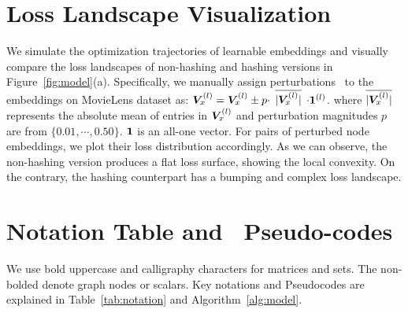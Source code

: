 \appendix

\section{Loss Landscape Visualization}
\label{sec:visualization}
We simulate the optimization trajectories of learnable embeddings and visually compare the loss landscapes of non-hashing and hashing versions in Figure~\ref{fig:model}(a).
Specifically, we manually assign perturbations~\cite{nahshan2021loss, bai2020binarybert} to the embeddings on MovieLens dataset as: {\footnotesize$\boldsymbol{V}_x^{(l)} = \boldsymbol{V}_x^{(l)} \pm p \cdot$ $\overline{|{\boldsymbol{V}_x^{(l)}|}}$ $\cdot \boldsymbol{1}^{(l)}$}.
where {\footnotesize$\overline{|{\boldsymbol{V}_x^{(l)}|}}$} represents the absolute mean of entries in {\footnotesize$\boldsymbol{V}_x^{(l)}$} and perturbation magnitudes $p$ are from $\{0.01, \cdots, 0.50\}$. $\boldsymbol{1}$ is an all-one vector. 
For pairs of perturbed node embeddings, we plot their loss distribution accordingly.
As we can observe, the non-hashing version produces a flat loss surface, showing the local convexity.
On the contrary, the hashing counterpart has a bumping and complex loss landscape.




\section{Notation Table and \model~Pseudo-codes}
\label{app:notation_and_code}
We use bold uppercase and calligraphy characters for matrices and sets. The non-bolded denote graph nodes or scalars. 
Key notations and Pseudocodes are explained in Table~\ref{tab:notation} and Algorithm~\ref{alg:model}.

